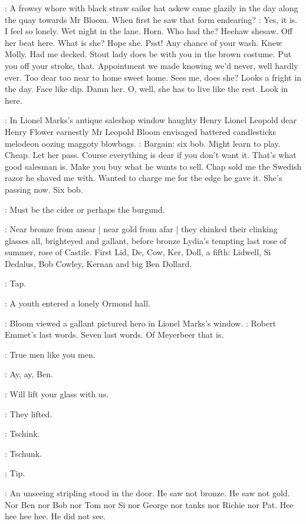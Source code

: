:
A frowsy whore with black straw sailor hat askew came glazily in the
day along the quay towards Mr Bloom.
When first he saw that form
endearing?
\BloomInt:
Yes,
it is.
I feel so lonely.
Wet night in the lane.
Horn.
Who
had the?
Heehaw shesaw.
Off her beat here.
What is she?
Hope she.
Psst!
Any chance of your wash.
Knew Molly.
Had me decked.
Stout lady does be
with you in the brown costume.
Put you off your stroke,
that.
Appointment
we made knowing we'd never,
well hardly ever.
Too dear too near to home
sweet home.
Sees me,
does she?
Looks a fright in the day.
Face like dip.
Damn her.
O,
well,
she has to live like the rest.
Look in here.

:
In Lionel Marks's antique saleshop window haughty Henry Lionel
Leopold dear Henry Flower earnestly Mr Leopold Bloom envisaged
battered candlesticks melodeon oozing maggoty blowbags.
\BloomInt:
Bargain:
six bob.
Might learn to play.
Cheap.
Let her pass.
Course everything is dear if
you don't want it.
That's what good salesman is.
Make you buy what he
wants to sell.
Chap sold me the Swedish razor he shaved me with.
Wanted
to charge me for the edge he gave it.
She's passing now.
Six bob.

\BloomInt:
Must be the cider or perhaps the burgund.

:
Near bronze from anear |
near gold from afar |
they chinked their clinking glasses all,
brighteyed and gallant,
before bronze Lydia's tempting
last rose of summer,
rose of Castile.
First Lid,
De,
Cow,
Ker,
Doll,
a fifth:
Lidwell,
Si Dedalus,
Bob Cowley,
Kernan and big Ben Dollard.

\stripling:
Tap.

:
A youth entered a lonely Ormond hall.

:
Bloom viewed a gallant pictured hero in Lionel Marks's window.
\BloomInt:
Robert Emmet's last words.
Seven last words.
Of Meyerbeer that is.

\dollard:
True men like you men.

\simon:
Ay,
ay,
Ben.

\dollard:
Will lift your glass with us.

:
They lifted.


:
Tschink.

:
Tschunk.

\stripling:
Tip.

:
An unseeing stripling stood in the door.
He saw not bronze.
He
saw not gold.
Nor Ben nor Bob nor Tom nor Si nor George nor tanks nor
Richie nor Pat.
Hee hee hee hee.
He did not see.

